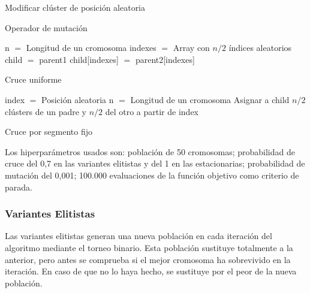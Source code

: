 \vspace{\baselineskip}

\begin{algorithm}[H]
    \SetAlgoLined
         {
            Modificar clúster de posición aleatoria \;
        }
    \caption{Operador de mutación}
\end{algorithm}

\vspace{\baselineskip}


\begin{algorithm}[H]
    \SetAlgoLined
        n $=$ Longitud de un cromosoma \;
        indexes $=$ Array con $n/2$ índices aleatorios \;
        child $=$ parent1 \;
        child[indexes] $=$ parent2[indexes] \;
    \caption{Cruce uniforme}
\end{algorithm}

\vspace{\baselineskip}

\begin{algorithm}[H]
    \SetAlgoLined
        index $=$ Posición aleatoria \;
        n $=$ Longitud de un cromosoma \;
        Asignar a child $n/2$ clústers de un padre y $n/2$ del otro a partir de index \;
    \caption{Cruce por segmento fijo}
\end{algorithm}

\vspace{\baselineskip}

Los hiperparámetros usados son: población de 50 cromosomas; probabilidad de cruce del 0,7 en las variantes elitistas y del 1 en las estacionarias; probabilidad de mutación del 0,001; 100.000 evaluaciones de la función objetivo como criterio de parada.

\subsubsection{Variantes Elitistas}

Las variantes elitistas generan una nueva población en cada iteración del algoritmo mediante el torneo binario. Esta población sustituye totalmente a la anterior, pero antes se comprueba si el mejor cromosoma ha sobrevivido en la iteración. En caso de que no lo haya hecho, se sustituye por el peor de la nueva población.

